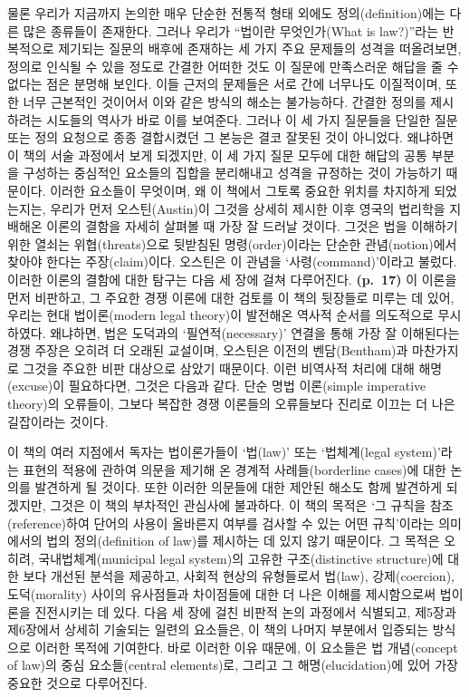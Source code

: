 물론 우리가 지금까지 논의한 매우 단순한 전통적 형태 외에도
정의(definition)에는 다른 많은 종류들이 존재한다. 그러나 우리가 “법이란
무엇인가(What is law?)”라는 반복적으로 제기되는 질문의 배후에 존재하는
세 가지 주요 문제들의 성격을 떠올려보면, 정의로 인식될 수 있을 정도로
간결한 어떠한 것도 이 질문에 만족스러운 해답을 줄 수 없다는 점은 분명해
보인다. 이들 근저의 문제들은 서로 간에 너무나도 이질적이며, 또한 너무
근본적인 것이어서 이와 같은 방식의 해소는 불가능하다. 간결한 정의를
제시하려는 시도들의 역사가 바로 이를 보여준다. 그러나 이 세 가지
질문들을 단일한 질문 또는 정의 요청으로 종종 결합시켰던 그 본능은 결코
잘못된 것이 아니었다. 왜냐하면 이 책의 서술 과정에서 보게 되겠지만, 이
세 가지 질문 모두에 대한 해답의 공통 부분을 구성하는 중심적인 요소들의
집합을 분리해내고 성격을 규정하는 것이 가능하기 때문이다. 이러한
요소들이 무엇이며, 왜 이 책에서 그토록 중요한 위치를 차지하게
되었는지는, 우리가 먼저 오스틴(Austin)이 그것을 상세히 제시한 이후
영국의 법리학을 지배해온 이론의 결함을 자세히 살펴볼 때 가장 잘 드러날
것이다. 그것은 법을 이해하기 위한 열쇠는 위협(threats)으로 뒷받침된
명령(order)이라는 단순한 관념(notion)에서 찾아야 한다는 주장(claim)이다.
오스틴은 이 관념을 ‘사령(command)’이라고 불렀다. 이러한 이론의 결함에
대한 탐구는 다음 세 장에 걸쳐 다루어진다. \textbf{(p.~17)} 이 이론을
먼저 비판하고, 그 주요한 경쟁 이론에 대한 검토를 이 책의 뒷장들로 미루는
데 있어, 우리는 현대 법이론(modern legal theory)이 발전해온 역사적
순서를 의도적으로 무시하였다. 왜냐하면, 법은 도덕과의
‘필연적(necessary)’ 연결을 통해 가장 잘 이해된다는 경쟁 주장은 오히려 더
오래된 교설이며, 오스틴은 이전의 벤담(Bentham)과 마찬가지로 그것을
주요한 비판 대상으로 삼았기 때문이다. 이런 비역사적 처리에 대해
해명(excuse)이 필요하다면, 그것은 다음과 같다. 단순 명법 이론(simple
imperative theory)의 오류들이, 그보다 복잡한 경쟁 이론들의 오류들보다
진리로 이끄는 더 나은 길잡이라는 것이다.

이 책의 여러 지점에서 독자는 법이론가들이 ‘법(law)’ 또는 ‘법체계(legal
system)’라는 표현의 적용에 관하여 의문을 제기해 온 경계적
사례들(borderline cases)에 대한 논의를 발견하게 될 것이다. 또한 이러한
의문들에 대한 제안된 해소도 함께 발견하게 되겠지만, 그것은 이 책의
부차적인 관심사에 불과하다. 이 책의 목적은 ‘그 규칙을
참조(reference)하여 단어의 사용이 올바른지 여부를 검사할 수 있는 어떤
규칙’이라는 의미에서의 법의 정의(definition of law)를 제시하는 데 있지
않기 때문이다. 그 목적은 오히려, 국내법체계(municipal legal system)의
고유한 구조(distinctive structure)에 대한 보다 개선된 분석을 제공하고,
사회적 현상의 유형들로서 법(law), 강제(coercion), 도덕(morality) 사이의
유사점들과 차이점들에 대한 더 나은 이해를 제시함으로써 법이론을
진전시키는 데 있다. 다음 세 장에 걸친 비판적 논의 과정에서 식별되고,
제5장과 제6장에서 상세히 기술되는 일련의 요소들은, 이 책의 나머지
부분에서 입증되는 방식으로 이러한 목적에 기여한다. 바로 이러한 이유
때문에, 이 요소들은 법 개념(concept of law)의 중심 요소들(central
elements)로, 그리고 그 해명(elucidation)에 있어 가장 중요한 것으로
다루어진다.

